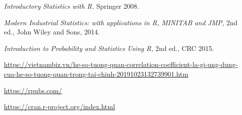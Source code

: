 \documentclass[a4paper]{article}
\theoremstyle{definition}
\begin{document}
\begin{thebibliography}{99999}
 {\em Introductory Statistics with R.}  Springer 2008.

{\em Modern Industrial Statistics: with applications in R, MINITAB and JMP,} 2nd ed.,  John Wiley and Sons, 2014.

{\em Introduction to Probability and Statistics Using R,} 2nd ed., CRC 2015.

 \url{https://vietnambiz.vn/he-so-tuong-quan-correlation-coefficient-la-gi-ung-dung-cua-he-so-tuong-quan-trong-tai-chinh-20191023132739901.htm}

 \url{https://rpubs.com/}

 \url{https://cran.r-project.org/index.html}

\end{thebibliography}
\end{document}
